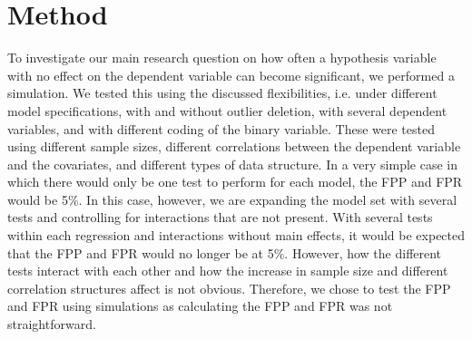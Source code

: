 \section{Method}
To investigate our main research question on how often a hypothesis variable with no effect on the dependent variable can become significant, we performed a simulation. We tested this using the discussed flexibilities, i.e. under different model specifications, with and without outlier deletion, with several dependent variables, and with different coding of the binary variable. These were tested using different sample sizes, different correlations between the dependent variable and the covariates, and different types of data structure. In a very simple case in which there would only be one test to perform for each model, the FPP and FPR would be 5\%. In this case, however, we are expanding the model set with several tests and controlling for interactions that are not present. With several tests within each regression and interactions without main effects, it would be expected that the FPP and FPR would no longer be at 5\%. However, how the different tests interact with each other and how the increase in sample size and different correlation structures affect is not obvious. Therefore, we chose to test the FPP and FPR using simulations as calculating the FPP and FPR was not straightforward.\\

